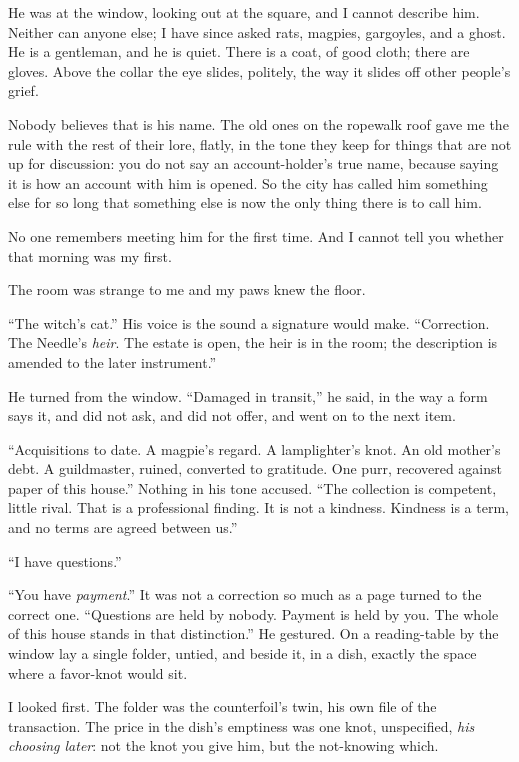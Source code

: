 He was at the window, looking out at the square, and I cannot describe him. Neither can anyone else; I have since asked rats, magpies, gargoyles, and a ghost. He is a gentleman, and he is quiet. There is a coat, of good cloth; there are gloves. Above the collar the eye slides, politely, the way it slides off other people's grief.

Nobody believes that is his name. The old ones on the ropewalk roof gave me the rule with the rest of their lore, flatly, in the tone they keep for things that are not up for discussion: you do not say an account-holder's true name, because saying it is how an account with him is opened. So the city has called him something else for so long that something else is now the only thing there is to call him.

No one remembers meeting him for the first time. And I cannot tell you whether that morning was my first.

The room was strange to me and my paws knew the floor.

``The witch's cat.'' His voice is the sound a signature would make. ``Correction. The Needle's \emph{heir}. The estate is open, the heir is in the room; the description is amended to the later instrument.''

He turned from the window. ``Damaged in transit,'' he said, in the way a form says it, and did not ask, and did not offer, and went on to the next item.

``Acquisitions to date. A magpie's regard. A lamplighter's knot. An old mother's debt. A guildmaster, ruined, converted to gratitude. One purr, recovered against paper of this house.'' Nothing in his tone accused. ``The collection is competent, little rival. That is a professional finding. It is not a kindness. Kindness is a term, and no terms are agreed between us.''

``I have questions.''

``You have \emph{payment}.'' It was not a correction so much as a page turned to the correct one. ``Questions are held by nobody. Payment is held by you. The whole of this house stands in that distinction.'' He gestured. On a reading-table by the window lay a single folder, untied, and beside it, in a dish, exactly the space where a favor-knot would sit.

I looked first. The folder was the counterfoil's twin, his own file of the transaction. The price in the dish's emptiness was one knot, unspecified, \emph{his choosing later}: not the knot you give him, but the not-knowing which.

